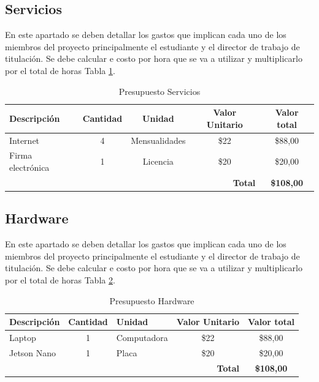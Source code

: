 \subsection{Servicios}
En este apartado se deben detallar los gastos que implican cada uno de los miembros del proyecto principalmente el estudiante y el director de trabajo de titulación. Se debe calcular e costo por hora que se va a utilizar y multiplicarlo por el total de horas Tabla \ref{tab:presupuesto-servicios}.
\begin{table}[H]
\centering
\caption{Presupuesto Servicios}
\label{tab:presupuesto-servicios}
\begin{tabular}{|l|c|c|c|c|}
\hline
\rowcolor[HTML]{B6DAF8}
\textbf{Descripción} & \textbf{Cantidad} & \textbf{Unidad} & \textbf{Valor Unitario} & \textbf{Valor total} \\ \hline
Internet             & 4                & Mensualidades    & \$22                     & \$88,00               \\ \hline
Firma electrónica    & 1                & Licencia         & \$20                     & \$20,00               \\ \hline
\multicolumn{4}{|r|}{\textbf{Total}}                          & \textbf{\$108,00}        \\ \hline
\end{tabular}
\end{table}

\subsection{Hardware}
En este apartado se deben detallar los gastos que implican cada uno de los miembros del proyecto principalmente el estudiante y el director de trabajo de titulación. Se debe calcular e costo por hora que se va a utilizar y multiplicarlo por el total de horas Tabla \ref{tab:presupuesto-hardware}.
\begin{table}[H]
\centering
\caption{Presupuesto Hardware}
\label{tab:presupuesto-hardware}
\begin{tabular}{|l|c|l|c|c|}
\hline
\rowcolor[HTML]{B6DAF8}
\textbf{Descripción} & \textbf{Cantidad} & \textbf{Unidad} & \textbf{Valor Unitario} & \textbf{Valor total} \\ \hline
Laptop               & 1                & Computadora     & \$22                    & \$88,00              \\ \hline
Jetson Nano          & 1                & Placa           & \$20                    & \$20,00              \\ \hline
\multicolumn{4}{|r|}{\textbf{Total}}                         & \textbf{\$108,00}       \\ \hline
\end{tabular}
\end{table}

